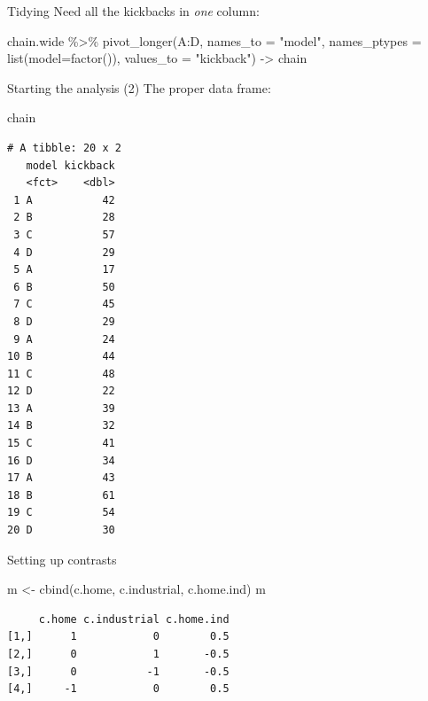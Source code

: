 \documentclass[
  ignorenonframetext,
]{beamer}
\newenvironment{Shaded}{\begin{snugshade}}{\end{snugshade}}
\newcommand{\AttributeTok}[1]{\textcolor[rgb]{0.40,0.45,0.13}{#1}}
\newcommand{\FunctionTok}[1]{\textcolor[rgb]{0.28,0.35,0.67}{#1}}
\newcommand{\NormalTok}[1]{\textcolor[rgb]{0.00,0.23,0.31}{#1}}
\newcommand{\OtherTok}[1]{\textcolor[rgb]{0.00,0.23,0.31}{#1}}
\newcommand{\SpecialCharTok}[1]{\textcolor[rgb]{0.37,0.37,0.37}{#1}}
\newcommand{\StringTok}[1]{\textcolor[rgb]{0.13,0.47,0.30}{#1}}
\begin{document}
\begin{frame}[fragile]{Tidying}
\protect\hypertarget{tidying}{}
Need all the kickbacks in \emph{one} column:

\begin{Shaded}
\begin{Highlighting}[]
\NormalTok{chain.wide }\SpecialCharTok{\%\textgreater{}\%} 
  \FunctionTok{pivot\_longer}\NormalTok{(A}\SpecialCharTok{:}\NormalTok{D, }\AttributeTok{names\_to =} \StringTok{"model"}\NormalTok{, }
               \AttributeTok{names\_ptypes =} \FunctionTok{list}\NormalTok{(}\AttributeTok{model=}\FunctionTok{factor}\NormalTok{()), }
               \AttributeTok{values\_to =} \StringTok{"kickback"}\NormalTok{) }\OtherTok{{-}\textgreater{}}\NormalTok{ chain}
\end{Highlighting}
\end{Shaded}
\end{frame}

\begin{frame}[fragile]{Starting the analysis (2)}
\protect\hypertarget{starting-the-analysis-2}{}
The proper data frame:

\begin{Shaded}
\begin{Highlighting}[]
\NormalTok{chain }
\end{Highlighting}
\end{Shaded}

\begin{verbatim}
# A tibble: 20 x 2
   model kickback
   <fct>    <dbl>
 1 A           42
 2 B           28
 3 C           57
 4 D           29
 5 A           17
 6 B           50
 7 C           45
 8 D           29
 9 A           24
10 B           44
11 C           48
12 D           22
13 A           39
14 B           32
15 C           41
16 D           34
17 A           43
18 B           61
19 C           54
20 D           30
\end{verbatim}
\end{frame}

\begin{frame}[fragile]{Setting up contrasts}
\protect\hypertarget{setting-up-contrasts}{}
\begin{Shaded}
\begin{Highlighting}[]
\NormalTok{m }\OtherTok{\textless{}{-}} \FunctionTok{cbind}\NormalTok{(c.home, c.industrial, c.home.ind)}
\NormalTok{m}
\end{Highlighting}
\end{Shaded}

\begin{verbatim}
     c.home c.industrial c.home.ind
[1,]      1            0        0.5
[2,]      0            1       -0.5
[3,]      0           -1       -0.5
[4,]     -1            0        0.5
\end{verbatim}

\begin{Shaded}
\end{Shaded}
\end{frame}
\end{document}

